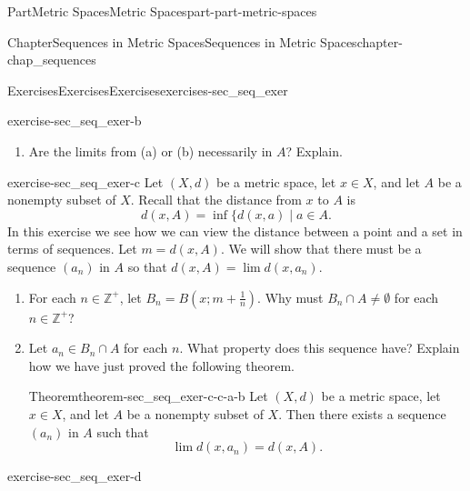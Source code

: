 \documentclass[oneside,10pt,]{book}
\numberwithin{equation}{chapter}
\newcommand{\Z}{\mathbb{Z}}
\newcommand{\Q}{\mathbb{Q}}
\newcommand{\gt}{>}
\begin{document}
\begin{partptx}{Part}{Metric Spaces}{}{Metric Spaces}{}{}{part-part-metric-spaces}
\begin{chapterptx}{Chapter}{Sequences in Metric Spaces}{}{Sequences in Metric Spaces}{}{}{chapter-chap_sequences}
\begin{exercises-section}{Exercises}{Exercises}{}{Exercises}{}{}{exercises-sec_seq_exer}
\begin{divisionexercise}{2}{}{}{exercise-sec_seq_exer-b}
\begin{enumerate}[font=\bfseries,label=(\alph*),ref=\alph*]
\item{}Are the limits from (a) or (b) necessarily in \(A\)? Explain.%
\end{enumerate}%
\end{divisionexercise}%
\begin{divisionexercise}{3}{}{}{exercise-sec_seq_exer-c}%
Let \((X,d)\) be a metric space, let \(x \in X\), and let \(A\) be a nonempty subset of \(X\). Recall that the distance from \(x\) to \(A\) is%
\begin{equation*}
d(x,A) = \inf \{d(x,a) \mid a \in A\text{.}
\end{equation*}
In this exercise we see how we can view the distance between a point and a set in terms of sequences. Let \(m = d(x,A)\). We will show that there must be a sequence \((a_n)\) in \(A\) so that \(d(x,A) = \lim d(x,a_n)\).%
\begin{enumerate}[font=\bfseries,label=(\alph*),ref=\alph*]%
\item{}For each \(n \in \Z^+\), let \(B_n = B\left(x;m+\frac{1}{n}\right)\). Why must \(B_n \cap A \neq \emptyset\) for each \(n \in \Z^+\)?%
\item{}Let \(a_n \in B_n \cap A\) for each \(n\). What property does this sequence have? Explain how we have just proved the following theorem.%
\begin{theorem}{Theorem}{}{}{theorem-sec_seq_exer-c-c-a-b}%
Let \((X,d)\) be a metric space, let \(x \in X\), and let \(A\) be a nonempty subset of \(X\). Then there exists a sequence \((a_n)\) in \(A\) such that%
\begin{equation*}
\lim d(x,a_n) = d(x,A)\text{.}
\end{equation*}
%
\end{theorem}
\end{enumerate}%
\end{divisionexercise}%
\begin{divisionexercise}{4}{}{}{exercise-sec_seq_exer-d}%
\end{divisionexercise}
\end{exercises-section}
\end{chapterptx}
\end{partptx}
\end{document}
